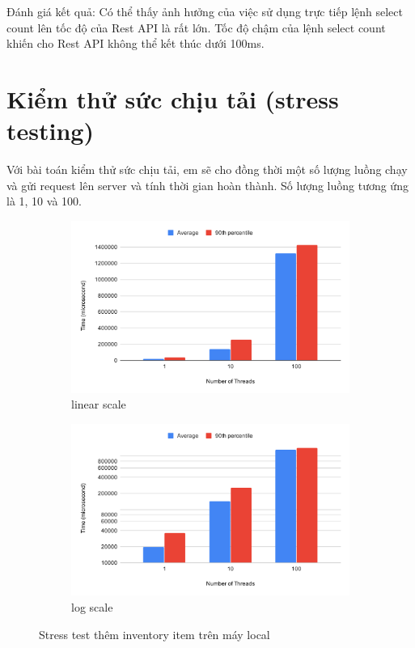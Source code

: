 Đánh giá kết quả: Có thể thấy ảnh hưởng của việc sử dụng
trực tiếp lệnh select count lên tốc độ của Rest API là rất lớn.
Tốc độ chậm của lệnh select count khiến cho Rest API không thể kết thúc
dưới 100ms.

\section{Kiểm thử sức chịu tải (stress testing)}
Với bài toán kiểm thử sức chịu tải, em sẽ cho đồng thời
một số lượng luồng chạy và gửi request lên server và
tính thời gian hoàn thành. Số lượng luồng tương ứng
là 1, 10 và 100.

\begin{figure}[H]
\centering
\begin{subfigure}{0.5\textwidth}
    \centering
    \includegraphics[width=\textwidth]
    {images/testing/stress-add-inventory-item.png}
    \caption{linear scale}
\end{subfigure}%
\begin{subfigure}{0.5\textwidth}
    \centering
    \includegraphics[width=\textwidth]
    {images/testing/stress-add-inventory-item-log.png}
    \caption{log scale}
\end{subfigure}
\caption{Stress test thêm inventory item trên máy local}
\end{figure}

